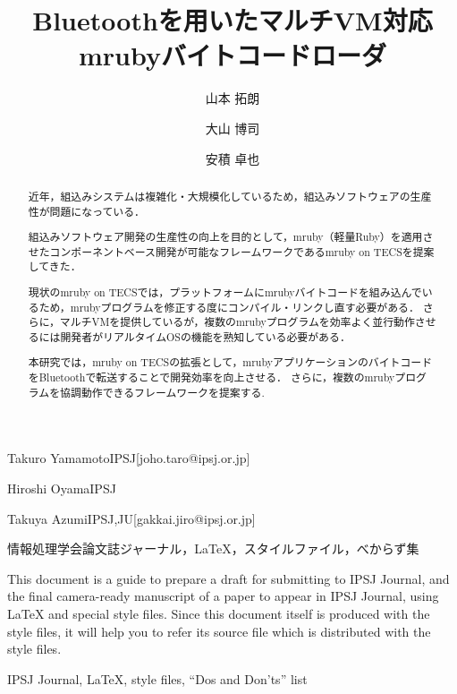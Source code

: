 \documentclass[submit]{ipsj_v2/UTF8/ipsj}
\begin{document}
\title{Bluetoothを用いたマルチVM対応\\mrubyバイトコードローダ}





\author{山本 拓朗}{Takuro Yamamoto}{IPSJ}[joho.taro@ipsj.or.jp]
\author{大山 博司}{Hiroshi Oyama}{IPSJ}
\author{安積 卓也}{Takuya Azumi}{IPSJ,JU}[gakkai.jiro@ipsj.or.jp]

\begin{abstract}
近年，組込みシステムは複雑化・大規模化しているため，組込みソフトウェアの生産性が問題になっている．

組込みソフトウェア開発の生産性の向上を目的として，mruby（軽量Ruby）を適用させたコンポーネントベース開発が可能なフレームワークであるmruby on TECSを提案してきた．

現状のmruby on TECSでは，プラットフォームにmrubyバイトコードを組み込んでいるため，mrubyプログラムを修正する度にコンパイル・リンクし直す必要がある．
さらに，マルチVMを提供しているが，複数のmrubyプログラムを効率よく並行動作させるには開発者がリアルタイムOSの機能を熟知している必要がある．

本研究では，mruby on TECSの拡張として，mrubyアプリケーションのバイトコードをBluetoothで転送することで開発効率を向上させる．
さらに，複数のmrubyプログラムを協調動作できるフレームワークを提案する.

\end{abstract}


\begin{jkeyword}
情報処理学会論文誌ジャーナル，\LaTeX，スタイルファイル，べからず集
\end{jkeyword}

\begin{eabstract}
This document is a guide to prepare a draft for submitting to IPSJ
Journal, and the final camera-ready manuscript of a paper to appear in
IPSJ Journal, using {\LaTeX} and special style files.  Since this
document itself is produced with the style files, it will help you to
refer its source file which is distributed with the style files.
\end{eabstract}

\begin{ekeyword}
IPSJ Journal, \LaTeX, style files, ``Dos and Don'ts'' list
\end{ekeyword}
\end{document}

